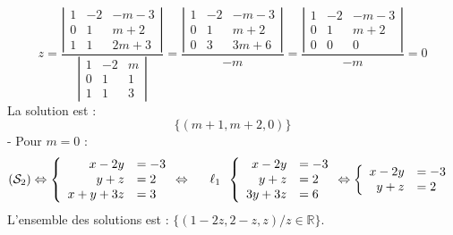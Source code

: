 {{$$z = 
\frac{\left|\begin{array}{ccc}
1 & -2 & -m-3 \\
0 & 1 & m+2 \\
1 & 1 & 2 m+3
\end{array}\right|}{\left|\begin{array}{ccc}
1 & -2 & m \\
0 & 1 & 1 \\
1 & 1 & 3
\end{array}\right|}
=\frac{\left|\begin{array}{ccc}
1 & -2 & -m-3 \\
0 & 1 & m+2 \\
0 & 3 & 3 m+6
\end{array}\right|}{-m}
=\frac{\left|\begin{array}{ccc}
1 & -2 & -m-3 \\
0 & 1 & m+2 \\
0 & 0 & 0
\end{array}\right|}{-m}
=0
$$
La solution est :
$$
\{(m+1, m+2,0)\}
$$
- Pour $m=0$ :
$$
\left(\mathcal{S}_2\right) \Leftrightarrow\left\{\begin{array} { r l } 
{ x - 2 y } & { = - 3 } \\
{ y + z } & { = 2 } \\
{ x + y + 3 z } & { = 3 }
\end{array} \Leftrightarrow \quad \begin{array} { r l } 
{ \ell _ { 1 } }
\end{array} \left\{\begin{array} { r l } 
{ x - 2 y } & { = - 3 } \\
{ y + z } & { = 2 } \\
{ 3 y + 3 z } & { = 6 }
\end{array} \Leftrightarrow \left\{\begin{array}{rl}
x-2 y & =-3 \\
y+z & =2
\end{array}\right.\right.\right.
$$
L'ensemble des solutions est : $\{(1-2 z, 2-z, z) / z \in \mathbb{R}\}$. }}
